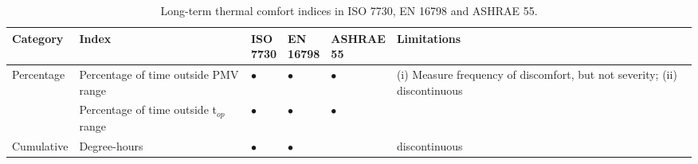 \begin{landscape}

\begin{table}[!h]
\centering
    \caption{Long-term thermal comfort indices in ISO 7730, EN 16798 and ASHRAE 55.}
        \label{tab:comfort-indices}
        \renewcommand{\arraystretch}{1.75}
        
    

        
            \begin{tabular}{ m{2.5cm} m{3.5cm} m{1.5cm} m{1.5cm} m{1.75cm} m{6cm} }

            \textbf{Category} & \textbf{Index} & \textbf{ISO \newline7730} & \textbf{EN \newline16798} & \textbf{ASHRAE \newline55} & \textbf{Limitations} \\
        
            \hline

            \multirow[t]{2}{2.5cm}{Percentage}  & Percentage of time outside PMV range & $\bullet$ & $\bullet$ & $\bullet$ & \multirow[t]{2}{6cm}{(i) Measure frequency of discomfort, but not severity; (ii) discontinuous } \\


            {}  & Percentage of time outside t$_{op}$ range & $\bullet$ & $\bullet$ & $\bullet$ & {} \\

            \hline

            \multirow[t]{2}{2.5cm}{Cumulative}  & Degree-hours & $\bullet$ & $\bullet$ & {} & {discontinuous} \\


\end{tabular}
\end{table}
\end{landscape}

